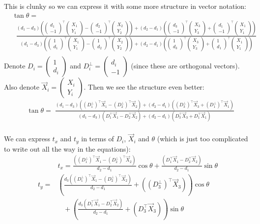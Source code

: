 \documentclass[11pt,english]{article}
\newcommand{\vect}[2]{\begin{pmatrix} #1 \\ #2 \end{pmatrix}}
\begin{document}
\begin{enumerate}
This is clunky so we can express it with some more structure in vector notation:
\begin{align*}
& \tan\theta = \\
&\;\; \frac{
(d_1-d_3)\left(\vect{d_1}{-1}^\top \vect{X_1}{Y_1} - \vect{d_2}{-1}^\top \vect{X_2}{Y_2} \right)
+ (d_2 - d_1)\left(\vect{d_3}{-1}^\top \vect{X_3}{Y_3} + \vect{d_1}{-1}^\top \vect{X_1}{Y_1} \right)
}{
(d_1-d_3)\left(\vect{1}{d_1}^\top \vect{X_1}{Y_1} - \vect{1}{d_2}^\top \vect{X_2}{Y_2} \right)
+ (d_2 - d_1)\left(\vect{1}{d_3}^\top \vect{X_3}{Y_3} + \vect{1}{d_1}^\top \vect{X_1}{Y_1} \right)
}  \\
\end{align*}
Denote $D_i = \vect{1}{d_i}$ and $D_i^\perp = \vect{d_i}{-1}$ (since these are orthogonal vectors). 
Also denote $\vec{X}_i = \vect{X_i}{Y_i}$. Then we see
the structure even better:
\begin{align*}
& \tan\theta =\; \frac{
(d_1-d_3)\left((D_1^\perp)^\top \vec{X}_1 - (D_2^\perp)^\top \vec{X}_2 \right)
+ (d_2 - d_1)\left((D_3^\perp)^\top \vec{X}_3 + (D_1^\perp)^\top \vec{X}_1 \right)
}{
(d_1-d_3)\left(D_1^\top \vec{X}_1 - D_2^\top \vec{X}_2 \right)
+ (d_2 - d_1)\left(D_3^\top \vec{X}_3 + D_1^\top \vec{X}_1 \right)
}  \\
\end{align*}

We can express $t_x$ and $t_y$ in terms of $D_i$, $\vec{X}_i$ and $\theta$ (which is just too complicated to write
out all the way in the equations):
\begin{align*}
& t_x = \frac{((D_1^\perp)^\top \vec{X}_1 - (D_2^\perp)^\top \vec{X}_2)}{d_2 - d_1}\cos\theta
		+ \frac{(D_1^\top \vec{X}_1 - D_2^\top \vec{X}_2)}{d_2 - d_1}\sin\theta \\
t_y =& \left( \frac{d_3((D_1^\perp)^\top \vec{X}_1 - (D_2^\perp)^\top \vec{X}_2)}{d_2 - d_1}
	+ ((D_3^\perp)^\top \vec{X}_3) \right) \cos\theta \\
& \;\;\; + \left( \frac{d_3(D_1^\top \vec{X}_1 - D_2^\top \vec{X}_2)}{d_2 - d_1}
	+ (D_3^\top \vec{X}_3)\right) \sin\theta  \\
\end{align*}



\end{enumerate}
\end{document}
